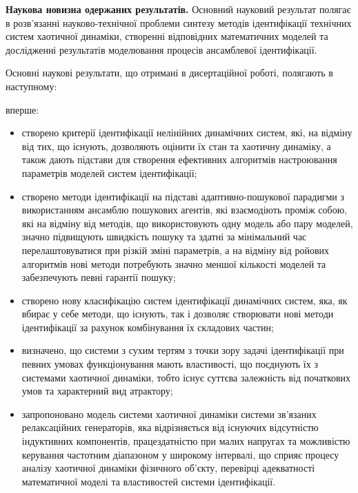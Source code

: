 \documentclass[a4paper,13pt]{atuaref}
\begin{document}
\smallskip
\textbf{Наукова новизна одержаних результатів.}
Основний науковий результат полягає в розв'язанні науково-технічної проблеми
синтезу методів ідентифікації
технічних систем хаотичної динаміки, створенні відповідних математичних
моделей та дослідженні результатів моделювання процесів
ансамблевої ідентифікації.

Основні наукові результати, що отримані в дисертаційної роботі, полягають
в наступному:

\noindent
вперше:
%
\begin{itemize}

  \item
  створено критерії ідентифікації нелінійних динамічних систем,
  які, на відміну від тих, що існують, дозволяють оцінити їх стан та
  хаотичну динаміку, а також дають підстави для створення ефективних алгоритмів
  настроювання параметрів моделей систем ідентифікації;

  \item
  створено методи ідентифікації на підставі
  адаптивно-пошукової парадигми з використанням ансамблю пошукових агентів,
  які взаємодіють проміж собою, які на відміну від методів, що використовують
  одну модель або пару моделей, значно підвищують швидкість пошуку та
  здатні за мінімальний час  перелаштовуватися при різкій зміні параметрів, а на
  відміну від ройових алгоритмів нові методи потребують значно меншої
  кількості моделей та забезпечують певні гарантії пошуку;

  \item
  створено нову класифікацію систем ідентифікації динамічних систем,
  яка, як вбирає у себе методи, що існують, так і дозволяє
  створювати нові методи ідентифікації за рахунок
  комбінування їх складових частин;

  \item
   визначено, що системи з сухим тертям з точки зору задачі ідентифікації
   при певних  умовах функціонування
   мають властивості, що поєднують їх з системами хаотичної динаміки, тобто існує
   суттєва залежність від початкових
   умов та характерний вид атрактору; %

  \item
   запропоновано модель системи хаотичної динаміки системи зв'язаних релаксаційних генераторів,
   яка відрізняється від існуючих відсутністю індуктивних компонентів,
   працездатністю при малих напругах та можливістю
   керування частотним діапазоном у широкому інтервалі,
   що сприяє процесу аналізу хаотичної динаміки
   фізичного об'єкту, перевірці адекватності математичної моделі
   та властивостей системи ідентифікації.
\end{itemize}
\end{document}
